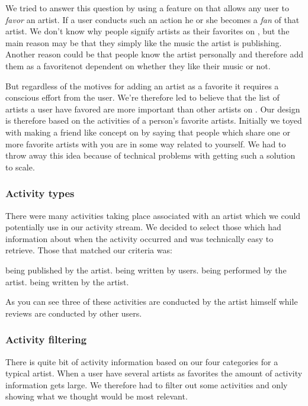 We tried to answer this question by using a feature on \urort{} that allows
any user to \emph{favor} an artist. If a user conducts such an action he or
she becomes a \emph{fan} of that artist. We don't know why people signify
artists as their favorites on \urort{}, but the main reason may be that
they simply like the music the artist is publishing.
Another reason could be that people know the artist personally and therefore
add them as a favorite\dash{}not dependent on whether they like their music or
not.

But regardless of the motives for adding an artist as a favorite it requires
a conscious effort from the user. We're therefore led to believe that the list
of artists a user have favored are more important than other artists on
\urort{}. Our design is therefore based on the activities of a person's
favorite artists. Initially we toyed with making a friend like concept on
\urort{} by saying that people which share one or more favorite artists with
you are in some way related to yourself. We had to throw away this idea because
of technical problems with getting such a solution to scale.

\subsubsection{Activity types}

There were many activities taking place associated with an artist
which we could potentially use in our activity stream. We decided to select
those which had information about when the activity occurred and was
technically easy%
to retrieve. Those that matched our criteria was:

\begin{items}
   being published by the artist.
   being written by users.
   being performed by the artist.
   being written by the artist.
\end{items}

As you can see three of these activities are conducted by the artist himself
while reviews are conducted by other users.

\subsubsection{Activity filtering}

There is quite bit of activity information based on our four categories for
a typical artist. When a user have several artists as favorites the amount of
activity information gets large. We therefore had to filter out some
activities and only showing what we thought would be most relevant.

